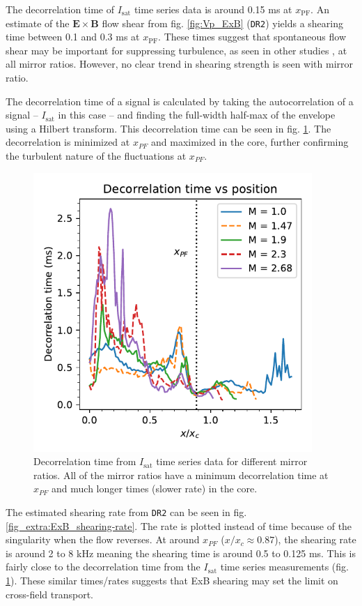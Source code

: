 The decorrelation time of $I_\text{sat}$ time series data is around 0.15 ms at $x_\text{PF}$. An estimate of the $\boldsymbol{E \times B}$ flow shear from fig. \ref{fig:Vp_ExB} (\texttt{DR2}) yields a shearing time between 0.1 and 0.3 ms at $x_\text{PF}$. These times suggest that spontaneous flow shear may be important for suppressing turbulence, as seen in other studies \cite{Schaffner_turbulence_2013,Cho_2005}, at all mirror ratios. However, no clear trend in shearing strength is seen with mirror ratio.

The decorrelation time of a signal is calculated by taking the autocorrelation of a signal -- $I_\text{sat}$ in this case -- and finding the full-width half-max of the envelope using a Hilbert transform. This decorrelation time can be seen in fig. \ref{fig_extra:decorrelation_time}. The decorrelation is minimized  at $x_{PF}$ and maximized in the core, further confirming the turbulent nature of the fluctuations at $x_{PF}$.
\begin{figure}
    \centering
    \includegraphics[width=300pt]{figures/extra/decorrelation_time.pdf}
    \caption[$I_\text{sat}$ decorrelation time]{Decorrelation time from $I_\text{sat}$ time series data for different mirror ratios. All of the mirror ratios have a minimum decorrelation time at $x_{PF}$ and much longer times (slower rate) in the core.}
    \label{fig_extra:decorrelation_time}
\end{figure}

The estimated shearing rate from \texttt{DR2} can be seen in fig. \ref{fig_extra:ExB_shearing-rate}. The rate is plotted instead of time because of the singularity when the flow reverses. At around $x_{PF}$ ($x/x_c \approx 0.87$), the shearing rate is around 2 to 8 kHz meaning the shearing time is around 0.5 to 0.125 ms. This is fairly close to the decorrelation time from the $I_\text{sat}$ time series measurements (fig. \ref{fig_extra:decorrelation_time}). These similar times/rates suggests that ExB shearing may set the limit on cross-field transport.

